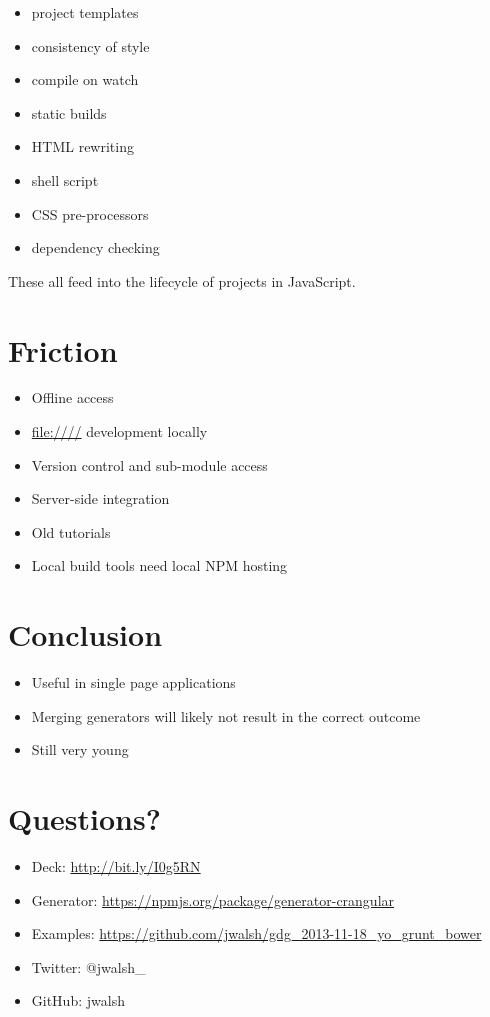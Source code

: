 \documentclass[11pt]{article}
\begin{document}
\begin{itemize}
\item project templates
\item consistency of style
\item compile on watch
\item static builds
\item HTML rewriting
\item shell script
\item CSS pre-processors
\item dependency checking
\end{itemize}

These all feed into the lifecycle of projects in JavaScript. 
\section*{Friction}
\label{sec-23}

\begin{itemize}
\item Offline access
\item \url{file:////} development locally
\item Version control and sub-module access
\item Server-side integration
\item Old tutorials
\item Local build tools need local NPM hosting
\end{itemize}
\section*{Conclusion}
\label{sec-24}

\begin{itemize}
\item Useful in single page applications
\item Merging generators will likely not result in the correct outcome
\item Still very young
\end{itemize}
\section*{Questions?}
\label{sec-25}

\begin{itemize}
\item Deck: \url{http://bit.ly/I0g5RN}
\item Generator: \url{https://npmjs.org/package/generator-crangular}
\item Examples: \url{https://github.com/jwalsh/gdg_2013-11-18_yo_grunt_bower}

\item Twitter: @jwalsh\_
\item GitHub: jwalsh
\end{itemize}
\end{document}
